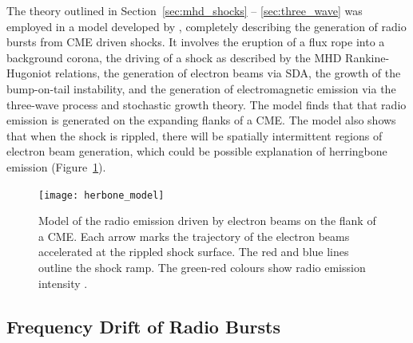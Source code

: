 The theory outlined in Section~\ref{sec:mhd_shocks} -- \ref{sec:three_wave} was employed in a model developed by \citet{schmidt2012b}, completely describing the generation of radio bursts from CME driven shocks. It involves the eruption of a flux rope into a background corona, the driving of a shock as described by the MHD Rankine-Hugoniot relations, the generation of electron beams via SDA, the growth of the bump-on-tail instability, and the generation of electromagnetic emission via the three-wave process and stochastic growth theory. The model finds that that radio emission is generated on the expanding flanks of a CME. The model also shows that when the shock is rippled, there will be spatially intermittent regions of electron beam generation, which could be possible explanation of herringbone emission (Figure~\ref{fig:herbone_model}).
\begin{figure}[t!]
\begin{center}
\texttt{[image: herbone\_model]}
\caption[Model of radio burst driven by expanding CME flanks]{Model of the radio emission driven by electron beams on the flank of a CME. Each arrow marks the trajectory of the electron beams accelerated at the rippled shock surface. The red and blue lines outline the shock ramp. The green-red colours show radio emission intensity \citet{schmidt2012b}.}
\label{fig:herbone_model}
\end{center}
\end{figure}


\subsection{Frequency Drift of Radio Bursts}\label{sec:freq_drift}

